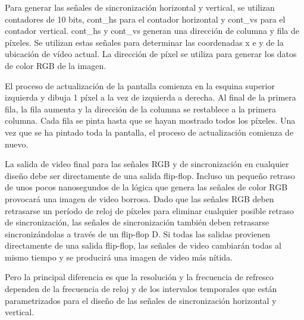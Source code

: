 Para generar las señales de sincronización horizontal y vertical, se utilizan contadores de 10 bits, cont\_hs para el contador horizontal y cont\_vs para 
el contador vertical. cont\_hs y cont\_vs generan una dirección de columna y fila de píxeles. Se utilizan estas señales para determinar las coordenadas x e 
y de la ubicación de vídeo actual. La dirección de píxel se utiliza para generar los datos de color RGB de la imagen.

El proceso de actualización de la pantalla comienza en la esquina superior izquierda y dibuja 1 píxel a la vez de izquierda a derecha. Al final de la 
primera fila, la fila aumenta y la dirección de la columna se restablece a la primera columna. Cada fila se pinta hasta que se hayan mostrado todos los 
píxeles. Una vez que se ha pintado toda la pantalla, el proceso de actualización comienza de nuevo.

La salida de video final para las señales RGB y de sincronización en cualquier diseño debe ser directamente de una salida flip-flop. Incluso un 
pequeño retraso de unos pocos nanosegundos de la lógica que genera las señales de color RGB provocará una imagen de video borrosa. 
Dado que las señales RGB deben retrasarse un período de reloj de píxeles para eliminar cualquier posible retraso de sincronización, 
las señales de sincronización también deben retrasarse sincronizándolas a través de un flip-flop D. Si todas las salidas provienen directamente de 
una salida flip-flop, las señales de video cambiarán todas al mismo tiempo y se producirá una imagen de video más nítida. 

Pero la principal diferencia es que la resolución y la frecuencia de refresco dependen de la frecuencia de reloj y de los intervalos temporales que 
están parametrizados para el diseño de las señales de sincronización horizontal y vertical.

